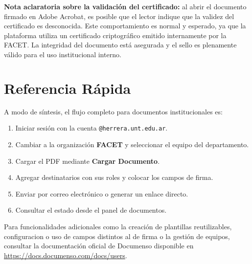 \medskip
\noindent\textbf{Nota aclaratoria sobre la validación del certificado:} al abrir el documento firmado en Adobe Acrobat, es posible que el lector indique que la validez del certificado es desconocida. Este comportamiento es normal y esperado, ya que la plataforma utiliza un certificado criptográfico emitido internamente por la FACET. La integridad del documento está asegurada y el sello es plenamente válido para el uso institucional interno.

\section{Referencia Rápida}
\label{AppendixD:Referencia}

A modo de síntesis, el flujo completo para documentos institucionales es:

\begin{enumerate}[nosep]
    \item Iniciar sesión con la cuenta \texttt{@herrera.unt.edu.ar}.
    \item Cambiar a la organización \textbf{FACET} y seleccionar el equipo del departamento.
    \item Cargar el PDF mediante \textbf{Cargar Documento}.
    \item Agregar destinatarios con sus roles y colocar los campos de firma.
    \item Enviar por correo electrónico o generar un enlace directo.
    \item Consultar el estado desde el panel de documentos.
\end{enumerate}

Para funcionalidades adicionales como la creación de plantillas reutilizables, configuracion o uso de campos distintos al de firma o la gestión de equipos, consultar la documentación oficial de Documenso disponible en \url{https://docs.documenso.com/docs/users}.
